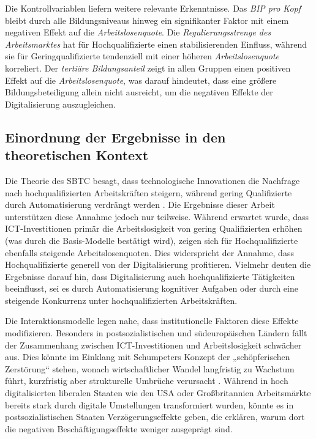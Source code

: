 Die Kontrollvariablen liefern weitere relevante Erkenntnisse. Das 
\textit{\ac{BIP} pro Kopf} bleibt durch alle Bildungsniveaus hinweg ein signifikanter 
Faktor mit einem negativen Effekt auf die \textit{Arbeitslosenquote}. Die 
\textit{Regulierungsstrenge des Arbeitsmarktes} hat für Hochqualifizierte einen 
stabilisierenden Einfluss, während sie für Geringqualifizierte tendenziell mit einer 
höheren \textit{Arbeitslosenquote} korreliert. Der \textit{tertiäre Bildungsanteil} zeigt 
in allen Gruppen einen positiven Effekt auf die \textit{Arbeitslosenquote}, was darauf 
hindeutet, dass eine größere Bildungsbeteiligung allein nicht ausreicht, um die negativen 
Effekte der Digitalisierung auszugleichen.

\subsection{Einordnung der Ergebnisse in den theoretischen Kontext}

Die Theorie des \ac{SBTC} besagt, dass technologische Innovationen die Nachfrage nach 
hochqualifizierten Arbeitskräften steigern, während gering Qualifizierte durch 
Automatisierung verdrängt werden \parencite[vgl.][S. 7]{acemoglu2002technical}. Die 
Ergebnisse dieser Arbeit unterstützen diese Annahme jedoch nur teilweise. Während 
erwartet wurde, dass \ac{ICT}-Investitionen primär die Arbeitslosigkeit von gering 
Qualifizierten erhöhen (was durch die Basis-Modelle bestätigt wird), zeigen sich für 
Hochqualifizierte ebenfalls steigende Arbeitslosenquoten. Dies widerspricht der Annahme, 
dass Hochqualifizierte generell von der Digitalisierung profitieren. Vielmehr deuten die 
Ergebnisse darauf hin, dass Digitalisierung auch hochqualifizierte Tätigkeiten 
beeinflusst, sei es durch Automatisierung kognitiver Aufgaben oder durch eine steigende 
Konkurrenz unter hochqualifizierten Arbeitskräften.

Die Interaktionsmodelle legen nahe, dass institutionelle Faktoren diese Effekte 
modifizieren. Besonders in postsozialistischen und südeuropäischen Ländern fällt der 
Zusammenhang zwischen \ac{ICT}-Investitionen und Arbeitslosigkeit schwächer aus. Dies 
könnte im Einklang mit Schumpeters Konzept der „schöpferischen Zerstörung“ stehen, 
wonach wirtschaftlicher Wandel langfristig zu Wachstum führt, kurzfristig aber 
strukturelle Umbrüche verursacht \parencite[vgl.][S. 103-105]{schumpeter1976capitalism}. 
Während in hoch digitalisierten liberalen Staaten wie den USA oder Großbritannien 
Arbeitsmärkte bereits stark durch digitale Umstellungen transformiert wurden, könnte es 
in postsozialistischen Staaten Verzögerungseffekte geben, die erklären, warum dort die 
negativen Beschäftigungseffekte weniger ausgeprägt sind.

